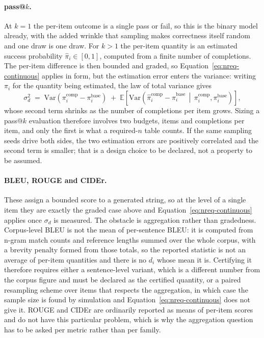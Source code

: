 \paragraph{pass@$k$.} At $k=1$ the per-item outcome is a single pass or fail, so
this is the binary model already, with the added wrinkle that sampling makes
correctness itself random and one draw is one draw. For $k > 1$ the per-item
quantity is an estimated success probability $\hat{\pi}_i \in [0,1]$, computed
from a finite number of completions. The per-item difference is then bounded and
graded, so Equation~\eqref{eq:nreq-continuous} applies in form, but the
estimation error enters the variance: writing $\pi_i$ for the quantity being
estimated, the law of total variance gives
\begin{equation}
\sigma_d^2 \;=\; \mathrm{Var}\!\left(\pi_i^{\mathrm{comp}} -
\pi_i^{\mathrm{base}}\right) \;+\;
\mathbb{E}\!\left[\mathrm{Var}\!\left(\hat{\pi}_i^{\mathrm{comp}} -
\hat{\pi}_i^{\mathrm{base}} \,\middle|\, \pi_i^{\mathrm{comp}},
\pi_i^{\mathrm{base}}\right)\right],
\label{eq:passk-variance}
\end{equation}
whose second term shrinks as the number of completions per item grows. Sizing a
pass@$k$ evaluation therefore involves two budgets, items and completions per
item, and only the first is what a required-$n$ table counts. If the same
sampling seeds drive both sides, the two estimation errors are positively
correlated and the second term is smaller; that is a design choice to be
declared, not a property to be assumed.

\paragraph{BLEU, ROUGE and CIDEr.} These assign a bounded score to a generated
string, so at the level of a single item they are exactly the graded case above
and Equation~\eqref{eq:nreq-continuous} applies once $\sigma_d$ is measured. The
obstacle is aggregation rather than gradedness. Corpus-level BLEU is not the
mean of per-sentence BLEU: it is computed from n-gram match counts and reference
lengths summed over the whole corpus, with a brevity penalty formed from those
totals, so the reported statistic is not an average of per-item quantities and
there is no $d_i$ whose mean it is. Certifying it therefore requires either a
sentence-level variant, which is a different number from the corpus figure and
must be declared as the certified quantity, or a paired resampling scheme over
items that respects the aggregation, in which case the sample size is found by
simulation and Equation~\eqref{eq:nreq-continuous} does not give it. ROUGE and
CIDEr are ordinarily reported as means of per-item scores and do not have this
particular problem, which is why the aggregation question has to be asked per
metric rather than per family.

